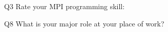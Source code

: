 \begin{description}%
\item{Q3} Rate your MPI programming skill:%
\item{Q8} What is your major role at your place of work?%
\end{description}%
